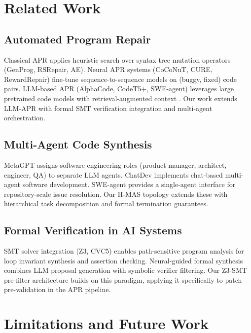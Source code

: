 \documentclass[10pt,twocolumn,letterpaper]{article}
\begin{document}
\section{Related Work}



\subsection{Automated Program Repair}


Classical APR applies heuristic search over syntax tree mutation operators (GenProg, RSRepair, AE). Neural APR systems (CoCoNuT, CURE, RewardRepair) fine-tune sequence-to-sequence models on (buggy, fixed) code pairs. LLM-based APR (AlphaCode, CodeT5+, SWE-agent) leverages large pretrained code models with retrieval-augmented context \cite{arxiv_2405_01543,arxiv_2501_02497}. Our work extends LLM-APR with formal SMT verification integration and multi-agent orchestration.


\subsection{Multi-Agent Code Synthesis}


MetaGPT \cite{crossref_10_48550_arxiv_2308_00352} assigns software engineering roles (product manager, architect, engineer, QA) to separate LLM agents. ChatDev \cite{crossref_10_18653_v1_2024_acl_long_810} implements chat-based multi-agent software development. SWE-agent \cite{crossref_10_48550_arxiv_2405_15793} provides a single-agent interface for repository-scale issue resolution. Our H-MAS topology extends these with hierarchical task decomposition and formal termination guarantees.


\subsection{Formal Verification in AI Systems}


SMT solver integration (Z3, CVC5) enables path-sensitive program analysis for loop invariant synthesis and assertion checking. Neural-guided formal synthesis combines LLM proposal generation with symbolic verifier filtering. Our Z3-SMT pre-filter architecture builds on this paradigm, applying it specifically to patch pre-validation in the APR pipeline.




\section{Limitations and Future Work}
\end{document}

